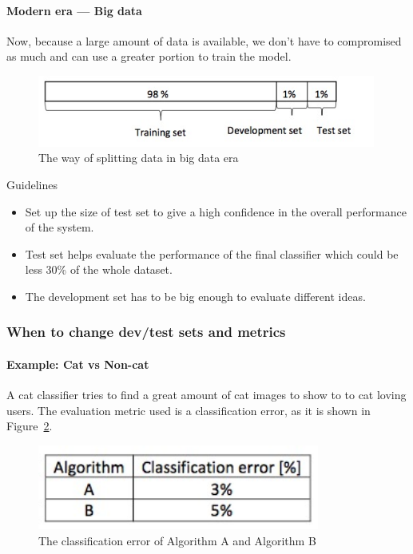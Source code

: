 \documentclass[UTF8]{article}
\begin{document}
\paragraph{Modern era --- Big data}
Now, because a large amount of data is available, we don't have to compromised as much and can use
a greater portion to train the model.

\begin{figure}[htb]
    \centering
    \includegraphics[width=30em]{figures/modern-era-splitting-data}
    \caption{The way of splitting data in big data era}
    \label{figures/modern-era-splitting-data}
\end{figure}

Guidelines
\begin{itemize}
    \item Set up the size of test set to give a high confidence in the overall performance of the
    system.
    \item Test set helps evaluate the performance of the final classifier which could be less 30\%
    of the whole dataset.
    \item The development set has to be big enough to evaluate different ideas.
\end{itemize}

\subsubsection{When to change dev/test sets and metrics}
\paragraph{Example: Cat vs Non-cat}
A cat classifier tries to find a great amount of cat images to show to to cat loving users. The
evaluation metric used is a classification error, as it is shown in
Figure~\ref{figures/classification-error}.

\begin{figure}[htb]
    \centering
    \includegraphics[width=25em]{figures/classification-error}
    \caption{The classification error of Algorithm A and Algorithm B}
    \label{figures/classification-error}
\end{figure}
\end{document}
